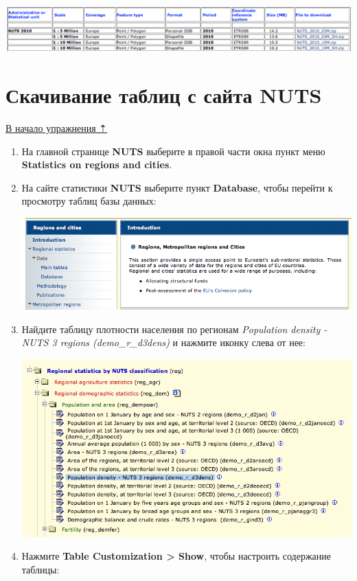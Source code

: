 \documentclass[]{book}
\theoremstyle{definition}
\theoremstyle{definition}
\theoremstyle{definition}
\theoremstyle{remark}
\begin{document}
\includegraphics{images/Ex08/image6.png}

\hypertarget{stat-map-economic-nuts-tables}{%
\section{Скачивание таблиц с сайта
NUTS}\label{stat-map-economic-nuts-tables}}

\protect\hyperlink{stat-map-economic}{В начало упражнения ⇡}

\begin{enumerate}
\def\labelenumi{\arabic{enumi}.}
\item
  На главной странице \textbf{NUTS} выберите в правой части окна пункт
  меню \textbf{Statistics on regions and cities}.
\item
  На сайте статистики \textbf{NUTS} выберите пункт \textbf{Database},
  чтобы перейти к просмотру таблиц базы данных:

  \includegraphics{images/Ex08/image7.png}
\item
  Найдите таблицу плотности населения по регионам \emph{Population
  density - NUTS 3 regions (demo\_r\_d3dens)} и нажмите иконку слева от
  нее:

  \includegraphics{images/Ex08/image8.png}
\item
  Нажмите \textbf{Table Customization \textgreater{} Show}, чтобы
  настроить содержание таблицы:


\end{enumerate}
\end{document}
